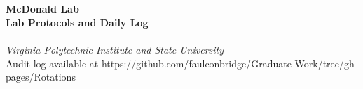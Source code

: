 
\begin{titlepage}
	{~ \\[5cm] }
	
	\noindent \HRule \\[0.4cm]
	{ \Huge \bfseries McDonald Lab \\[0.4cm] }
	{ \huge \bfseries Lab Protocols and Daily Log \\ }
	\HRule \\[0.4cm]
	
	{ \large \emph{Virginia Polytechnic Institute and State University} }\\[11cm]
	
	\noindent Audit log available at https://github.com/faulconbridge/Graduate-Work/tree/gh-pages/Rotations
\end{titlepage}